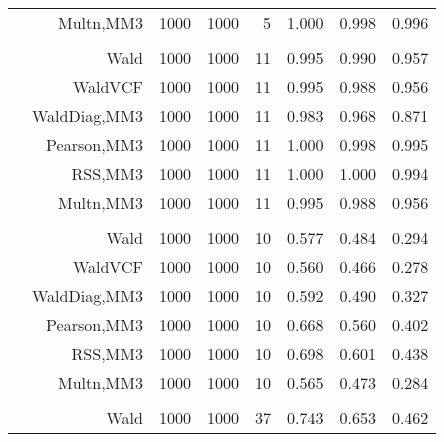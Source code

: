 \documentclass[
]{article}
\begin{document}
\begin{table}[H]
{\begin{tabular}[t]{lrrrrrrr}
\hspace{1em} & Multn,MM3 & 1000 & 1000 & 5 & 1.000 & 0.998 & 0.996\\
\cmidrule{1-8}
\addlinespace[0.3em]
\multicolumn{8}{l}{\textbf{1F 15V}}\\
\hspace{1em} & Wald & 1000 & 1000 & 11 & 0.995 & 0.990 & 0.957\\

\hspace{1em} & WaldVCF & 1000 & 1000 & 11 & 0.995 & 0.988 & 0.956\\

\hspace{1em} & WaldDiag,MM3 & 1000 & 1000 & 11 & 0.983 & 0.968 & 0.871\\

\hspace{1em} & Pearson,MM3 & 1000 & 1000 & 11 & 1.000 & 0.998 & 0.995\\

\hspace{1em} & RSS,MM3 & 1000 & 1000 & 11 & 1.000 & 1.000 & 0.994\\

\hspace{1em} & Multn,MM3 & 1000 & 1000 & 11 & 0.995 & 0.988 & 0.956\\
\cmidrule{1-8}
\addlinespace[0.3em]
\multicolumn{8}{l}{\textbf{2F 10V}}\\
\hspace{1em} & Wald & 1000 & 1000 & 10 & 0.577 & 0.484 & 0.294\\

\hspace{1em} & WaldVCF & 1000 & 1000 & 10 & 0.560 & 0.466 & 0.278\\

\hspace{1em} & WaldDiag,MM3 & 1000 & 1000 & 10 & 0.592 & 0.490 & 0.327\\

\hspace{1em} & Pearson,MM3 & 1000 & 1000 & 10 & 0.668 & 0.560 & 0.402\\

\hspace{1em} & RSS,MM3 & 1000 & 1000 & 10 & 0.698 & 0.601 & 0.438\\

\hspace{1em} & Multn,MM3 & 1000 & 1000 & 10 & 0.565 & 0.473 & 0.284\\
\cmidrule{1-8}
\addlinespace[0.3em]
\multicolumn{8}{l}{\textbf{3F 15V}}\\
\hspace{1em} & Wald & 1000 & 1000 & 37 & 0.743 & 0.653 & 0.462\\


\end{tabular}}
\end{table}
\end{document}
